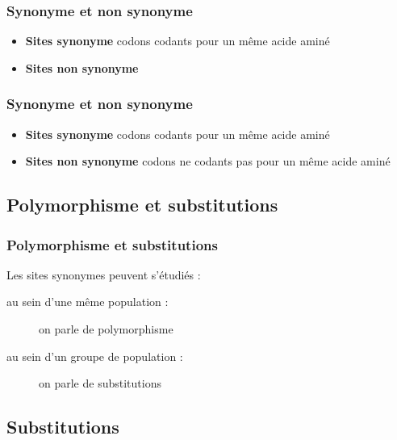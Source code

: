 \begin{frame}
    \frametitle{Synonyme et non synonyme}
    
    \small

    \begin{itemize}
        \item \textbf{Sites synonyme} codons codants pour un même acide aminé
        \item \textbf{Sites non synonyme} 
    \end{itemize}


\end{frame}


\begin{frame}
    \frametitle{Synonyme et non synonyme}
    
    \small
    \begin{itemize}
        \item \textbf{Sites synonyme} codons codants pour un même acide aminé
        \item \textbf{Sites non synonyme} codons ne codants pas pour un même acide aminé
    \end{itemize}

\end{frame}

\subsection{Polymorphisme et substitutions}
\begin{frame}
    \frametitle{Polymorphisme et substitutions}
   
    \begin{block}{Les sites synonymes peuvent s'étudiés :}
        \begin{description}
            \item [au sein d’une même population :] on parle de polymorphisme
            \item [au sein d’un groupe de population :] on parle de substitutions 
        \end{description}
    \end{block}
    


\end{frame}

\subsection{Substitutions}
\begin{frame}
    

\end{frame}

